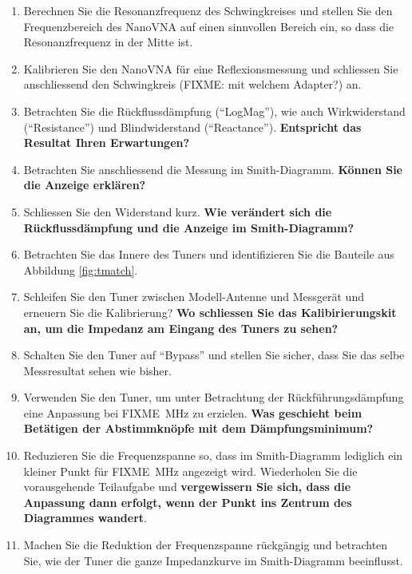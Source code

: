 \documentclass[twoside,a4paper,11pt,halfparskip,DIV=11,notitlepage]{scrartcl}
\begin{document}
\begin{enumerate}
    \item Berechnen Sie die Resonanzfrequenz des Schwingkreises und stellen Sie den
        Frequenzbereich des NanoVNA auf einen sinnvollen Bereich ein, so dass die
        Resonanzfrequenz in der Mitte ist.
    \item Kalibrieren Sie den NanoVNA für eine Reflexionsmessung und schliessen Sie
        anschliessend den Schwingkreis (FIXME: mit welchem Adapter?) an.
    \item Betrachten Sie die Rückflussdämpfung (``LogMag''), wie auch Wirkwiderstand
        (``Resistance'') und Blindwiderstand (``Reactance'').
        \textbf{Entspricht das Resultat Ihren Erwartungen?}
    \item Betrachten Sie anschliessend die Messung im Smith-Diagramm. \textbf{Können Sie die
        Anzeige erklären?}
    \item Schliessen Sie den Widerstand kurz. \textbf{Wie verändert sich die Rückflussdämpfung
        und die Anzeige im Smith-Diagramm?}\\
        \hline
    \item Betrachten Sie das Innere des Tuners und identifizieren Sie die Bauteile aus 
        Abbildung \ref{fig:tmatch}.
    \item Schleifen Sie den Tuner zwischen Modell-Antenne und Messgerät und erneuern Sie die
        Kalibrierung? \textbf{Wo schliessen Sie das Kalibirierungskit an, um die Impedanz
        am Eingang des Tuners zu sehen?}
    \item Schalten Sie den Tuner auf ``Bypass'' und stellen Sie sicher, dass Sie das selbe
        Messresultat sehen wie bisher.
    \item Verwenden Sie den Tuner, um unter Betrachtung der Rückführungsdämpfung eine
        Anpassung bei FIXME~MHz zu erzielen. \textbf{Was geschieht beim Betätigen der
        Abstimmknöpfe mit dem Dämpfungsminimum?}
    \item Reduzieren Sie die Frequenzspanne so, dass im Smith-Diagramm lediglich ein
        kleiner Punkt für FIXME~MHz angezeigt wird. Wiederholen Sie die
        vorausgehende Teilaufgabe und \textbf{vergewissern Sie sich, dass die Anpassung
        dann erfolgt, wenn der Punkt ins Zentrum des Diagrammes wandert}.
    \item Machen Sie die Reduktion der Frequenzspanne rückgängig und betrachten Sie, wie
        der Tuner die ganze Impedanzkurve im Smith-Diagramm beeinflusst.
\end{enumerate}
\end{document}
